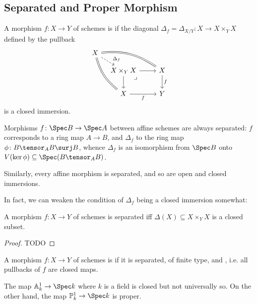 \documentclass[wip, algebra]{bsteffan-lecturenotes}
\newcommand{\A}{\mathbb{A}}
\renewcommand{\P}{\mathbb{P}}
\begin{document}
\subsection{Separated and Proper Morphism}
\begin{definition}
	A morphism $f\colon X \to Y$ of schemes is  if the diagonal $\Delta_f = \Delta_{X / Y}\colon X \to X \times_Y X$ defined by the pullback
	\begin{equation*}
		\begin{tikzcd}
			X
					\ar[dr, dashed, "\Delta_f" near end]
					\ar[drr, equals, bend left = 20]
					\ar[ddr, equals, bend right = 18]
			\\[-.7em]
				&[-1.5em] X \times_Y X
					\ar[r]
					\ar[d]
					\ar[dr, phantom, "\lrcorner" very near start]
				& X
					\ar[d, "f"]
			\\
				& X
					\ar[r, swap, "f"]
				& Y
		\end{tikzcd}
	\end{equation*}
	is a closed immersion.
\end{definition}
\begin{example}
	Morphisms $f\colon \Spec B \to \Spec A$ between affine schemes are always separated: 
	$f$ corresponds to a ring map $A \to B$, and $\Delta_f$ to the ring map $\phi\colon B \tensor_A B \surj B$, whence $\Delta_f$ is an isomorphism from $\Spec B$ onto $V(\ker \phi) \subseteq \Spec(B \tensor_A B)$.

	Similarly, every affine morphism is separated, and so are open and closed immersions.
\end{example}
In fact, we can weaken the condition of $\Delta_f$ being a closed immersion somewhat:
\begin{proposition}
	A morphism $f\colon X \to Y$ of schemes is separated iff $\Delta(X) \subseteq X \times_Y X$ is a closed subset.
\end{proposition}
\begin{proof}
	TODO
\end{proof}
\begin{definition}
	A morphism $f\colon X \to Y$ of schemes is  if it is separated, of finite type, and , i.e. all pullbacks of $f$ are closed maps.
\end{definition}
\begin{example}
	The map $\A^1_k \to \Spec k$ where $k$ is a field is closed but not universally so.
	On the other hand, the map $\P^1_k \to \Spec k$ is proper.
\end{example}
\end{document}
